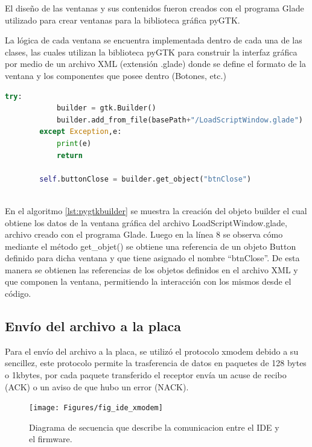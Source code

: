 El diseño de las ventanas y sus contenidos fueron creados con el programa Glade\cite{glade} utilizado para crear ventanas para la biblioteca gráfica pyGTK.

La lógica de cada ventana se encuentra implementada dentro de cada una de las clases, las cuales utilizan la biblioteca pyGTK para construir la interfaz gráfica por medio de un archivo XML (extensión .glade) donde se define el formato de la ventana y los componentes que posee dentro (Botones, etc.)

\begin{lstlisting}[language={python},label={lst:pygtkbuilder},caption=Porción de código que muestra la creación de la ventana a partir del archivo glade] 
		try:
			builder = gtk.Builder()
			builder.add_from_file(basePath+"/LoadScriptWindow.glade")
		except Exception,e:
			print(e)
			return

		self.buttonClose = builder.get_object("btnClose")
		
\end{lstlisting}

En el algoritmo \ref{lst:pygtkbuilder} se muestra la creación del objeto builder el cual obtiene los datos de la ventana gráfica del archivo LoadScriptWindow.glade, archivo creado con el programa Glade. Luego en la línea 8 se observa cómo mediante el método get\_objet() se obtiene una referencia de un objeto Button definido para dicha ventana y que tiene asignado el nombre “btnClose”. De esta manera se obtienen las referencias de los objetos definidos en el archivo XML y que componen la ventana, permitiendo la interacción con los mismos desde el código.


\subsection{Envío del archivo a la placa}

Para el envío del archivo a la placa, se utilizó el protocolo xmodem debido a su sencillez, este protocolo permite la trasferencia de datos en paquetes de 128 bytes o 1kbytes, por cada paquete transferido el receptor envía un acuse de recibo (ACK) o un aviso de que hubo un error (NACK).

\begin{figure}[ht]
  \centering
    \texttt{[image: Figures/fig\_ide\_xmodem]}
  \caption{Diagrama de secuencia que describe la comunicacion entre el IDE y el firmware.}
  \label{fig:secuencexmodem}
\end{figure}

